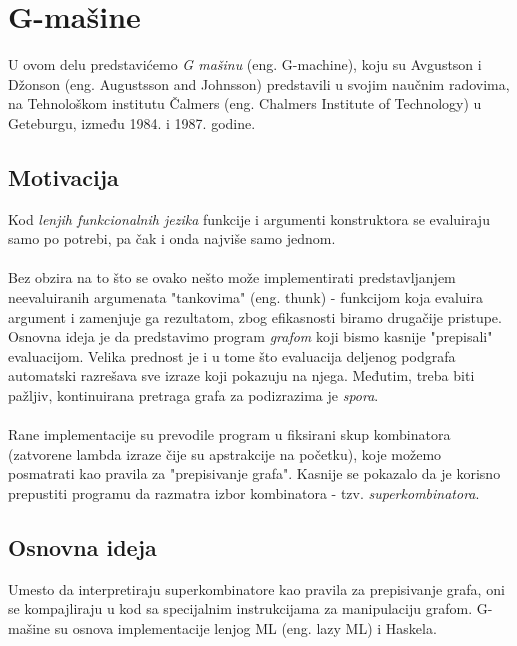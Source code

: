 \section{G-mašine}
\label{sec:Gmasine}

U ovom delu predstavićemo {\em G mašinu} (eng. G-machine), koju su Avgustson i Džonson (eng. Augustsson and Johnsson) predstavili u svojim naučnim radovima, na Tehnološkom institutu Čalmers (eng. Chalmers Institute of Technology) u Geteburgu, između 1984. i 1987. godine. 

\subsection{Motivacija}
Kod {\em lenjih funkcionalnih jezika} funkcije i argumenti konstruktora se evaluiraju samo po potrebi, pa čak i onda najviše samo jednom. \\
\\Bez obzira na to što se ovako nešto može implementirati predstavljanjem neevaluiranih argumenata "tankovima" (eng. thunk) - funkcijom koja evaluira argument i zamenjuje ga rezultatom, zbog efikasnosti biramo drugačije pristupe. \\Osnovna ideja je da predstavimo program {\em grafom} koji bismo kasnije "prepisali"  evaluacijom. Velika prednost je i u tome što evaluacija deljenog podgrafa automatski razrešava sve izraze koji pokazuju na njega. Međutim, treba biti pažljiv, kontinuirana pretraga grafa za podizrazima je {\em spora}. \\\\
Rane implementacije su prevodile program u fiksirani skup kombinatora (zatvorene lambda izraze čije su apstrakcije na početku), koje možemo posmatrati kao pravila za "prepisivanje grafa". Kasnije se pokazalo da je korisno prepustiti programu da razmatra izbor kombinatora - tzv. {\em superkombinatora}. \\ %


\subsection{Osnovna ideja} 
Umesto da interpretiraju superkombinatore kao pravila za prepisivanje grafa, oni se kompajliraju u kod sa specijalnim instrukcijama za manipulaciju grafom. G-mašine su osnova implementacije lenjog ML (eng. lazy ML) i Haskela. 

